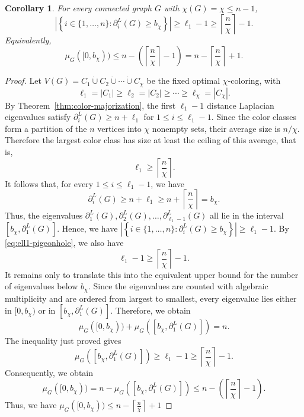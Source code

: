\documentclass[10pt,a4paper]{amsart}
\newtheorem{corollary}{Corollary}
\newcommand{\ceil}[1]{\left\lceil #1 \right\rceil}
\begin{document}
\begin{corollary}\label{cor:many-above-bchi}
For every connected graph $G$ with $\chi(G)=\chi\le n-1$,
\[
    \left|\left\{i\in\{1,
\dots,n\}:\partial_i^L(G)\ge b_\chi\right\}\right|
    \ge \ell_1-1\ge \ceil{\frac{n}{\chi}}-1.
\]
Equivalently,
\[
    \mu_G([0,b_\chi))\le n-\left(\ceil{\frac{n}{\chi}}-1\right)
    =n-\ceil{\frac{n}{\chi}}+1.
\]
\end{corollary}

\begin{proof}
	Let $V(G)=C_1\dot\cup C_2\dot\cup\cdots\dot\cup C_\chi$ be the fixed optimal $\chi$-coloring, with
	\[
	\ell_1=|C_1|\ge \ell_2=|C_2|\ge\cdots\ge \ell_\chi=|C_\chi|.
	\]
	By Theorem~\ref{thm:color-majorization}, the first $\ell_1-1$ distance Laplacian eigenvalues satisfy
	 $\partial_i^L(G)\ge n+\ell_1$ for  $1\le i\le \ell_1-1.$ Since the color classes form a partition of the $n$ vertices into $\chi$ nonempty sets, their average size is $n/\chi$. Therefore the largest color class has size at least the ceiling of this average, that is,
	\begin{equation}\label{eq:ell1-pigeonhole}
		\ell_1\ge \ceil{\frac{n}{\chi}}.
	\end{equation}
	It follows that, for every $1\le i\le \ell_1-1$, we have
	\[
	\partial_i^L(G)
	\ge n+\ell_1
	\ge n+\ceil{\frac{n}{\chi}}
	=
	b_\chi.
	\]
	Thus, the eigenvalues $\partial_1^L(G),\partial_2^L(G),\dots,\partial_{\ell_1-1}^L(G)$ 	all lie in the interval
	 $[b_\chi,\partial_1^L(G)].$ 	Hence, we have  $\left|\left\{i\in\{1,\dots,n\}:\partial_i^L(G)\ge b_\chi\right\}\right|
	\ge \ell_1-1.$ By \eqref{eq:ell1-pigeonhole}, we also have
	\[
	\ell_1-1\ge \ceil{\frac{n}{\chi}}-1.
	\]
	 It remains only to translate this into the equivalent upper bound for the number of eigenvalues below $b_\chi$. Since the eigenvalues are counted with algebraic multiplicity and are ordered from largest to smallest, every eigenvalue lies either in
	 $[0,b_\chi)$ or in $[b_\chi,\partial_1^L(G)].$ 
	Therefore, we obtain
	\[
	\mu_G([0,b_\chi))
	+
	\mu_G([b_\chi,\partial_1^L(G)])
	=
	n.
	\]
	The inequality just proved gives
	\[
	\mu_G([b_\chi,\partial_1^L(G)])
	\ge
	\ell_1-1
	\ge
	\ceil{\frac{n}{\chi}}-1.
	\]
	Consequently, we obtain
	\[
	\mu_G([0,b_\chi))
	=
	n-\mu_G([b_\chi,\partial_1^L(G)])
	\le
	n-\left(\ceil{\frac{n}{\chi}}-1\right).
	\]
	Thus, we have  $\mu_G([0,b_\chi))
	\le
	n-\ceil{\tfrac{n}{\chi}}+1$ 
\end{proof}
\end{document}
